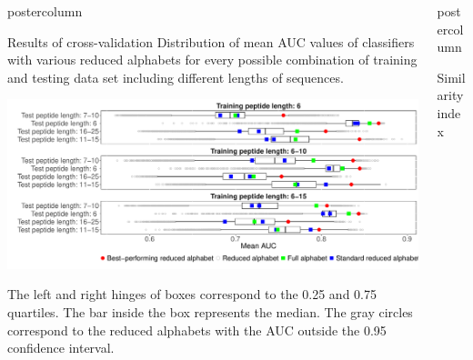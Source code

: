 \documentclass[final]{beamer}\usepackage[]{graphicx}\usepackage[]{color}
\makeatletter
\def\maxwidth{ %
  \ifdim\Gin@nat@width>\linewidth
    \linewidth
  \else
    \Gin@nat@width
  \fi
}
\newenvironment{knitrout}{}{} %
\newlength{\columnheight}
\makeatother
\begin{document}
\begin{frame}
\begin{columns}
\begin{column}{.50\textwidth}
\begin{beamercolorbox}[center,wd=\textwidth]{postercolumn}
\begin{minipage}[T]{.95\textwidth}
{\begin{block}{Results of cross-validation}
Distribution of mean AUC values of classifiers with various reduced alphabets 
for every possible combination of training and testing data set including 
different lengths of sequences. 

\begin{knitrout}
\color{fgcolor}

{\centering \includegraphics[width=\maxwidth]{figure/unnamed-chunk-1-1} 

}



\end{knitrout}

\tiny
The left and right hinges of boxes correspond to 
the 0.25 and 0.75 quartiles. The bar inside the box represents the median. The 
gray circles correspond to the reduced alphabets with the AUC outside the 0.95 
confidence interval.

\end{block}
\vfill




}
\end{minipage}
\end{beamercolorbox}
\end{column}



\begin{column}{.51\textwidth}
\begin{beamercolorbox}[center,wd=\textwidth]{postercolumn}
\begin{minipage}[T]{.95\textwidth}  
\parbox[t][\columnheight]{\textwidth}
{


\begin{block}{Similarity index}
\begin{knitrout}
\color{fgcolor}


\end{knitrout}
\end{block}}
\end{minipage}
\end{beamercolorbox}
\end{column}
\end{columns}
\end{frame}
\end{document}
